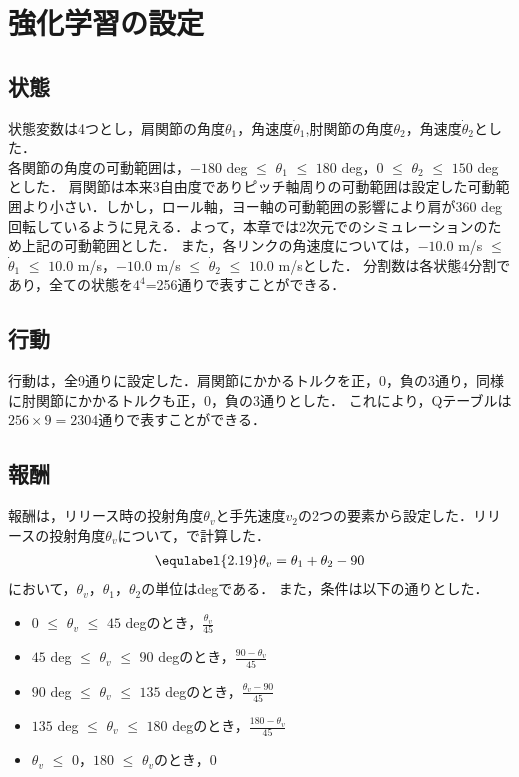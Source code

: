 \section{強化学習の設定}
\subsection{状態}
状態変数は4つとし，肩関節の角度$\theta_{1}$，角速度$\dot{\theta}_{1}$,肘関節の角度$\theta_{2}$，角速度$\dot{\theta}_{2}$とした．\\
各関節の角度の可動範囲は，$-180$ deg $\le$ $\theta_{1}$ $\le$ $180$ deg，$0$ $\le$ $\theta_{2}$ $\le$ $150$ deg\cite{range}とした．
肩関節は本来3自由度でありピッチ軸周りの可動範囲は設定した可動範囲より小さい．しかし，ロール軸，ヨー軸の可動範囲の影響により肩が$360$ deg 回転しているように見える．よって，本章では2次元でのシミュレーションのため上記の可動範囲とした．
また，各リンクの角速度については，$-10.0$ m/s $\le$ $\dot{\theta}_{1}$ $\le$ $10.0$ m/s，$-10.0$ m/s $\le$ $\dot{\theta}_{2}$ $\le$ $10.0$ m/sとした．
分割数は各状態4分割であり，全ての状態を$4^{4}$=256通りで表すことができる．
\subsection{行動}
行動は，全9通りに設定した．肩関節にかかるトルクを正，0，負の3通り，同様に肘関節にかかるトルクも正，0，負の3通りとした．
これにより，Qテーブルは$256 \times 9=2304$通りで表すことができる．
\subsection{報酬}
報酬は，リリース時の投射角度$\theta_{v}$と手先速度$v_{2}$の2つの要素から設定した．リリースの投射角度$\theta_{v}$について，で計算した．
\begin{eqnarray}
  \equlabel{2.19}
  \theta_{v}=\theta_{1}+\theta_{2}-90
\end{eqnarray}
において，$\theta_{v}$，$\theta_{1}$，$\theta_{2}$の単位はdegである．
また，条件は以下の通りとした．\\
\begin{itemize}
  \item $0$ $\le$ $\theta_{v}$ $\le$ $45$ degのとき，$\frac{\theta_{v}}{45}$
  \item $45$ deg $\le$ $\theta_{v}$ $\le$ $90$ degのとき，$\frac{90-\theta_{v}}{45}$
  \item $90$ deg $\le$ $\theta_{v}$ $\le$ $135$ degのとき，$\frac{\theta_{v}-90}{45}$
  \item $135$ deg $\le$ $\theta_{v}$ $\le$ $180$ degのとき，$\frac{180-\theta_{v}}{45}$
  \item $\theta_{v}$ $\le$ $0$，$180$ $\le$ $\theta_{v}$のとき，$0$\\
\end{itemize}

